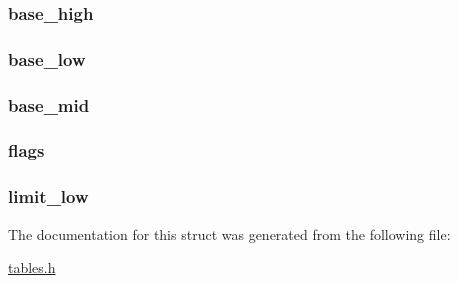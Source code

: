 \subsubsection[{base\+\_\+high}]{ base\+\_\+high}\label{structgdt__entry__struct_a706c81b840522a69ab6e6e941630d5e4}
\hypertarget{structgdt__entry__struct_a0a776dced2c26f16298425cde39f8364}{}
\subsubsection[{base\+\_\+low}]{ base\+\_\+low}\label{structgdt__entry__struct_a0a776dced2c26f16298425cde39f8364}
\hypertarget{structgdt__entry__struct_a35c709a004babd09046db9f667ba0646}{}
\subsubsection[{base\+\_\+mid}]{ base\+\_\+mid}\label{structgdt__entry__struct_a35c709a004babd09046db9f667ba0646}
\hypertarget{structgdt__entry__struct_a138dda98fcd4738346af61bcca8cf4b4}{}
\subsubsection[{flags}]{ flags}\label{structgdt__entry__struct_a138dda98fcd4738346af61bcca8cf4b4}
\hypertarget{structgdt__entry__struct_af9013229edfb91d4820f66b8df890ce3}{}
\subsubsection[{limit\+\_\+low}]{ limit\+\_\+low}\label{structgdt__entry__struct_af9013229edfb91d4820f66b8df890ce3}


The documentation for this struct was generated from the following file\+:\begin{DoxyCompactItemize}
\item 
\hyperlink{tables_8h}{tables.\+h}\end{DoxyCompactItemize}
